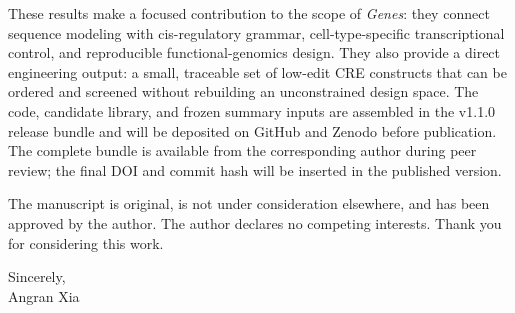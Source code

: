 \documentclass[11pt,a4paper]{article}
\begin{document}
These results make a focused contribution to the scope of \emph{Genes}: they connect
sequence modeling with cis-regulatory grammar, cell-type-specific transcriptional
control, and reproducible functional-genomics design. They also provide a direct
engineering output: a small, traceable set of low-edit CRE constructs that can be
ordered and screened without rebuilding an unconstrained design space. The code,
candidate library, and frozen summary inputs are assembled in the v1.1.0 release bundle
and will be deposited on GitHub and Zenodo before publication. The complete bundle is
available from the corresponding author during peer review; the final DOI and commit
hash will be inserted in the published version.

The manuscript is original, is not under consideration elsewhere, and has been
approved by the author. The author declares no competing interests. Thank you for
considering this work.

Sincerely,\\[0.8em]
Angran Xia
\end{document}

